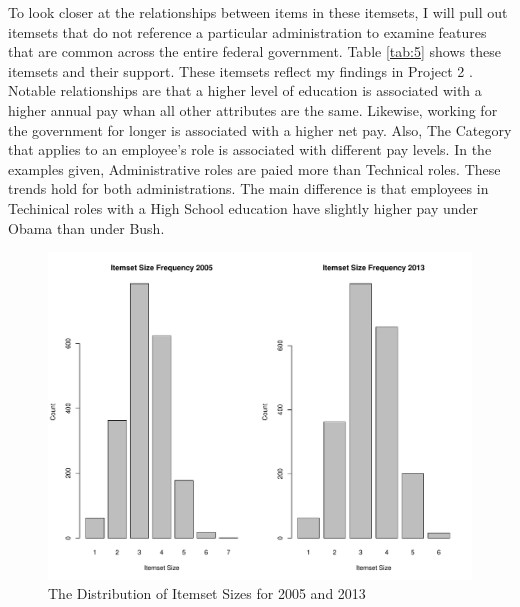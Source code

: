 \documentclass{article}
\begin{document}
    To look closer at the relationships between items in these itemsets, I will pull out itemsets that do not reference a particular administration to examine features that are common across the entire federal government. Table \ref{tab:5} shows these itemsets and their support. These itemsets reflect my findings in Project 2 \cite{proj2}. Notable relationships are that a higher level of education is associated with a higher annual pay whan all other attributes are the same. Likewise, working for the government for longer is associated with a higher net pay. Also, The Category that applies to an employee's role is associated with different pay levels. In the examples given, Administrative roles are paied more than Technical roles. These trends hold for both administrations. The main difference is that employees in Techinical roles with a High School education have slightly higher pay under Obama than under Bush.

    \begin{center}
        \begin{figure}
            \includegraphics[scale=0.4]{./images/freq-itemset-sizes.pdf}
            \caption{The Distribution of Itemset Sizes for 2005 and 2013}
            \label{fig:1}
        \end{figure}
    \end{center}
\end{document}
